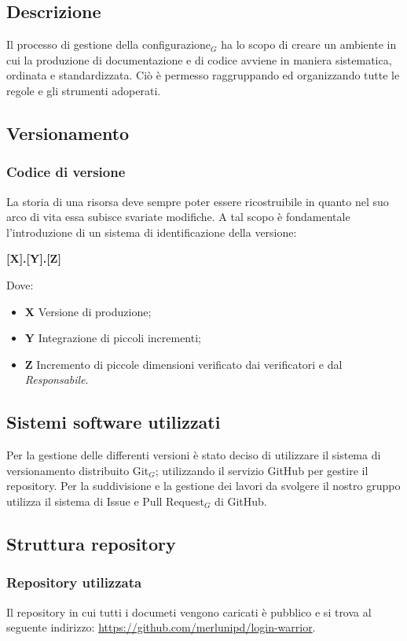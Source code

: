  \subsection{Descrizione}
    Il processo di gestione della configurazione$_G$ ha lo scopo di creare un ambiente in cui la produzione di
    documentazione e di codice avviene in maniera sistematica, ordinata e standardizzata. Ciò è permesso
    raggruppando ed organizzando tutte le regole e gli strumenti adoperati.
 \subsection{Versionamento}
   \subsubsection{Codice di versione}
   La storia di una risorsa deve sempre poter essere ricostruibile in quanto nel suo arco di vita essa subisce
   svariate modifiche. A tal scopo è fondamentale l'introduzione di un sistema di identificazione della
   versione:
   \begin{center}
       \textbf{[X].[Y].[Z]}
   \end{center}
   Dove:
   \begin{itemize}
       \item \textbf{X} Versione di produzione;
       \item \textbf{Y} Integrazione di piccoli incrementi;
       \item \textbf{Z} Incremento di piccole dimensioni verificato dai verificatori e dal \textit{Responsabile}.
   \end{itemize}


 \subsection{Sistemi software utilizzati}
 Per la gestione delle differenti versioni è stato deciso di utilizzare il sistema di versionamento distribuito Git$_G$; utilizzando il servizio GitHub per gestire il repository.
 Per la suddivisione e la gestione dei lavori da svolgere il nostro gruppo utilizza il sistema di Issue e Pull Request$_G$ di GitHub.

 \subsection{Struttura repository}
  \subsubsection{Repository utilizzata}
  Il repository in cui tutti i documeti vengono caricati è pubblico e si trova al seguente indirizzo:
  \url{https://github.com/merlunipd/login-warrior}.


